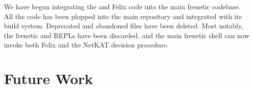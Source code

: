 We have begun integrating the \netauto{} and Felix code into the main frenetic
codebase. All the code has been plopped into the main repository and integrated
with its build system. Deprecated and abandoned files have been deleted. Most
notably, the frenetic and \netauto{} REPLs have been discarded, and the main
frenetic shell can now invoke both Felix and the NetKAT decision procedure.

\section{Future Work}
